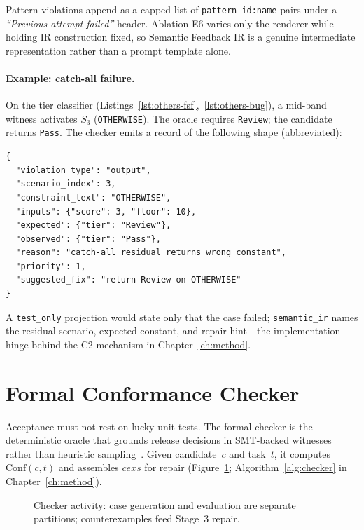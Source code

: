 Pattern violations append as a capped list of \texttt{pattern\_id:name}
pairs under a \emph{``Previous attempt failed''} header.
Ablation E6 varies only the renderer while holding IR construction fixed,
so Semantic Feedback IR is a genuine intermediate representation rather than a
prompt template alone.

\paragraph{Example: catch-all failure.}
On the tier classifier (Listings~\ref{lst:others-fsf},~\ref{lst:others-bug}),
a mid-band witness activates $S_3$ (\texttt{OTHERWISE}).
The oracle requires \texttt{Review}; the candidate returns \texttt{Pass}.
The checker emits a record of the following shape (abbreviated):
\begin{lstlisting}[language={},basicstyle=\ttfamily\footnotesize,frame=single]
{
  "violation_type": "output",
  "scenario_index": 3,
  "constraint_text": "OTHERWISE",
  "inputs": {"score": 3, "floor": 10},
  "expected": {"tier": "Review"},
  "observed": {"tier": "Pass"},
  "reason": "catch-all residual returns wrong constant",
  "priority": 1,
  "suggested_fix": "return Review on OTHERWISE"
}
\end{lstlisting}
A \texttt{test\_only} projection would state only that the case failed;
\texttt{semantic\_ir} names the residual scenario, expected constant, and
repair hint---the implementation hinge behind the C2 mechanism in
Chapter~\ref{ch:method}.

\section{Formal Conformance Checker}
\label{sec:impl:checker}

Acceptance must not rest on lucky unit tests.
The formal checker is the deterministic oracle that grounds release decisions
in SMT-backed witnesses rather than heuristic
sampling~\citep{claessen2000quickcheck}.
Given candidate~$c$ and task~$t$, it computes $\mathrm{Conf}(c,t)$ and
assembles $\mathit{cexs}$ for repair (Figure~\ref{fig:checker-activity};
Algorithm~\ref{alg:checker} in Chapter~\ref{ch:method}).

\begin{figure}[t]
  \centering
  \caption{Checker activity: case generation and evaluation are separate
           partitions; counterexamples feed Stage~3 repair.}
  \label{fig:checker-activity}
\end{figure}


